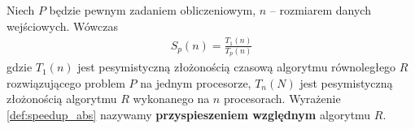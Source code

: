 \begin{definicja}
Niech \(P\) będzie pewnym zadaniem obliczeniowym, \(n\) -- rozmiarem danych wejściowych. Wówczas
\begin{align}\label{def:speedup_rel}
 S_{p}(n)=\frac{T_{1}(n)}{T_{p}(n)}
\end{align}
gdzie \(T_{1}(n)\) jest pesymistyczną złożonością czasową algorytmu równoległego \(R\) rozwiązującego problem \(P\) na jednym procesorze, \(T_{n}(N)\) jest pesymistyczną złożonością algorytmu \(R\) wykonanego na \(n\) procesorach. Wyrażenie \ref{def:speedup_abs} nazywamy \textbf{przyspieszeniem względnym} algorytmu \(R\).
\end{definicja}